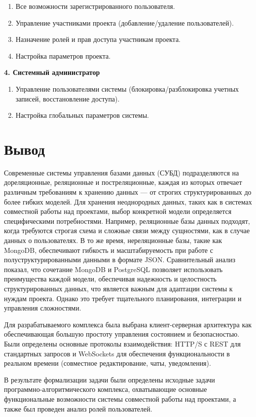 \begin{enumerate}[leftmargin=1.6\parindent]
    \item Все возможности зарегистрированного пользователя.
    \item Управление участниками проекта (добавление/удаление пользователей).
    \item Назначение ролей и прав доступа участникам проекта.
    \item Настройка параметров проекта.
\end{enumerate}

\textbf{4. Системный администратор}

\begin{enumerate}[leftmargin=1.6\parindent]
    \item Управление пользователями системы (блокировка/разблокировка учетных записей, восстановление доступа).
    \item Настройка глобальных параметров системы.
\end{enumerate}

\section*{Вывод}

Современные системы управления базами данных (СУБД) подразделяются на дореляционные, реляционные и постреляционные, каждая из которых отвечает различным требованиям к хранению данных — от строгих структурированных до более гибких моделей. 
Для хранения неоднородных данных, таких как в системах совместной работы над проектами, выбор конкретной модели определяется специфическими потребностями. 
Например, реляционные базы данных подходят, когда требуются строгая схема и сложные связи между сущностями, как в случае данных о пользователях. 
В то же время, нереляционные базы, такие как MongoDB, обеспечивают гибкость и масштабируемость при работе с полуструктурированными данными в формате JSON. 
Сравнительный анализ показал, что сочетание MongoDB и PostgreSQL позволяет использовать преимущества каждой модели, обеспечивая надежность и целостность структурированных данных, что является важным для адаптации системы к нуждам проекта. 
Однако это требует тщательного планирования, интеграции и управления сложностями.

Для разрабатываемого комплекса была выбрана клиент-серверная архитектура как обеспечивающая большую простоту управления состоянием и безопасностью. 
Были определены основные протоколы взаимодействия: HTTP/S с REST для стандартных запросов и WebSockets для обеспечения функциональности в реальном времени (совместное редактирование, чаты, уведомления).

В результате формализации задачи были определены исходные задачи программно-алгоритмического комплекса, охватывающие основные функциональные возможности системы совместной работы над проектами, а также был проведен анализ ролей пользователей.
